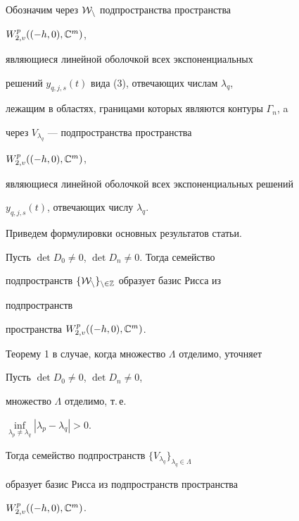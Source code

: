  


Обозначим через $\cal W_n$ подпространства пространства 


$W^p_{2,v}((-h,0),\Bbb C^m)$, 


являющиеся линейной оболочкой всех экспоненциальных 


решений $y_{q,j,s}(t)$ вида (3), отвечающих числам $\lambda_q$, 


лежащим в областях, границами которых являются контуры $\Gamma_n$, a 


через $V_{\lambda_q}$ --- подпространства пространства 


$W^p_{2,v}((-h,0),\Bbb C^m)$, 


являющиеся линейной оболочкой всех экспоненциальных решений 


$y_{q,j,s}(t)$, отвечающих числу $\lambda_q$. 


 


Приведем формулировки основных результатов статьи. 


 


\begin{thm} 


Пусть $\det D_0\ne0$, $\det D_n\ne0$. Тогда семейство 


подпространств $\{\cal W_n\}_{n\in\Bbb Z}$ образует базис Рисса из 


подпространств 


пространства $W^p_{2,v}((-h,0),\Bbb C^m)$. 


\end{thm} 


 


Теорему 1 в случае, когда множество $\Lambda$ отделимо, уточняет 


 


\begin{thm} 


Пусть $\det D_0\ne0$, $\det D_n\ne0$, 


множество $\Lambda$ отделимо, т.\,е. 


$\inf\limits_{\lambda_p\ne\lambda_q}|\lambda_p-\lambda_q|>0$. 


Тогда семейство подпространств $\{V_{\lambda_q}\}_{\lambda_q\in\Lambda}$ 


образует базис Рисса из подпространств пространства 


$W^p_{2,v}((-h,0),\Bbb C^m)$. 


\end{thm} 


